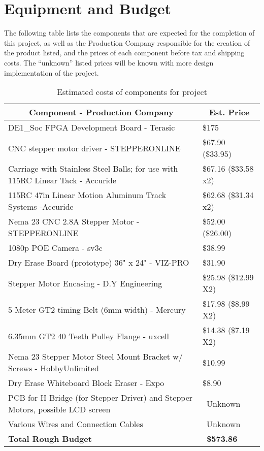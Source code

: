\section{Equipment and Budget}
The following table lists the components that are expected for the completion of this project, as well as the Production Company responsible for the creation of the product listed, and the prices of each component before tax and shipping costs. The ``unknown'' listed prices will be known with more design implementation of the project.
\setlength{\parindent}{5ex}
\begin{table} [H]
	\normalsize
	\centering
	\begin{tabular}{|l|l|}
		\hline
		\multicolumn{1}{|c|}{\textbf{Component - Production Company}}  & \multicolumn{1}{|c|}{\textbf{Est. Price}} \\
		\hline
		DE1\_Soc FPGA Development Board - Terasic & \$175 \\
		\hline
		CNC stepper motor driver - STEPPERONLINE & \$67.90 (\$33.95) \\
		\hline
		Carriage with Stainless Steel Balls; for use with 115RC Linear Tack - Accuride & \$67.16 (\$33.58 x2) \\ 
		\hline 		
		115RC 47in Linear Motion Aluminum Track Systems -Accuride & \$62.68 (\$31.34 x2) \\
		\hline
		Nema 23 CNC 2.8A Stepper Motor - STEPPERONLINE & \$52.00 (\$26.00) \\
		\hline
		1080p POE Camera - sv3c & \$38.99 \\
		\hline
		Dry Erase Board (prototype) 36" x 24" - VIZ-PRO & \$31.90 \\
		\hline
		Stepper Motor Encasing - D.Y Engineering & \$25.98 (\$12.99 X2) \\
		\hline
		5 Meter GT2 timing Belt (6mm width) - Mercury & \$17.98 (\$8.99 X2) \\
		\hline
		6.35mm GT2 40 Teeth Pulley Flange - uxcell & \$14.38 (\$7.19 X2) \\
		\hline
		Nema 23 Stepper Motor Steel Mount Bracket w/ Screws - HobbyUnlimited & \$10.99 \\
		\hline
		Dry Erase Whiteboard Block Eraser - Expo & \$8.90 \\
		\hline
		PCB for H Bridge (for Stepper Driver) and Stepper Motors, possible LCD screen & \ Unknown \\
		\hline
		Various Wires and Connection Cables & \ Unknown \\
		\hline 
		\textbf{Total Rough Budget} & \ \textbf{\$573.86} \\
		\hline 
	\end{tabular} 
	\caption{Estimated costs of components for project}
	\label{table:1}
\end{table}	

